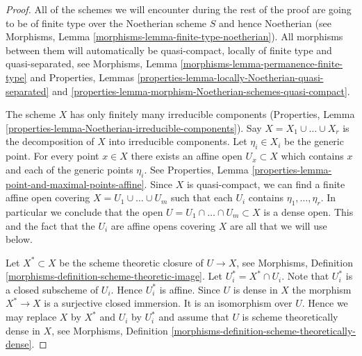 \begin{proof}
All of the schemes we will encounter during the rest of the proof
are going to be of finite type over the Noetherian scheme $S$ and
hence Noetherian
(see Morphisms, Lemma \ref{morphisms-lemma-finite-type-noetherian}).
All morphisms between them will automatically be quasi-compact, locally of
finite type and quasi-separated, see
Morphisms, Lemma \ref{morphisms-lemma-permanence-finite-type} and
Properties,
Lemmas \ref{properties-lemma-locally-Noetherian-quasi-separated} and
\ref{properties-lemma-morphism-Noetherian-schemes-quasi-compact}.

\medskip\noindent
The scheme $X$ has only finitely many irreducible components
(Properties, Lemma \ref{properties-lemma-Noetherian-irreducible-components}).
Say $X = X_1 \cup \ldots \cup X_r$ is the decomposition
of $X$ into irreducible components.
Let $\eta_i \in X_i$ be the generic point.
For every point $x \in X$ there exists an affine open
$U_x \subset X$ which contains $x$ and each of the generic
points $\eta_i$. See
Properties, Lemma \ref{properties-lemma-point-and-maximal-points-affine}.
Since $X$ is quasi-compact, we can find a finite affine open
covering $X = U_1 \cup \ldots \cup U_m$ such that
each $U_i$ contains $\eta_1, \ldots, \eta_r$.
In particular we conclude that the open
$U = U_1 \cap \ldots \cap U_m \subset X$ is
a dense open. This and the fact that the $U_i$ are affine opens
covering $X$ are all that we will use below.

\medskip\noindent
Let $X^* \subset X$ be the scheme theoretic closure of $U \to X$, see
Morphisms, Definition \ref{morphisms-definition-scheme-theoretic-image}.
Let $U_i^* = X^* \cap U_i$. Note that $U_i^*$ is a closed subscheme
of $U_i$. Hence $U_i^*$ is affine. Since $U$ is dense in $X$ the
morphism $X^* \to X$ is a surjective closed immersion. It is an
isomorphism over $U$. Hence we may replace $X$ by $X^*$ and
$U_i$ by $U_i^*$ and assume that $U$ is scheme theoretically dense
in $X$, see
Morphisms, Definition \ref{morphisms-definition-scheme-theoretically-dense}.


\end{proof}
